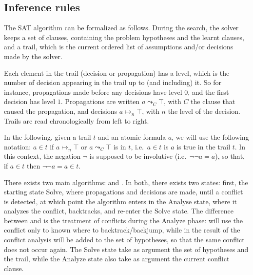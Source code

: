\documentclass{article}
\begin{document}
\subsection{Inference rules}\label{sec:trail}

The SAT algorithm can be formalized as follows. During the search, the solver keeps
a set of clauses, containing the problem hypotheses and the learnt clauses, and
a trail, which is the current ordered list of assumptions and/or decisions made by
the solver.

Each element in the trail (decision or propagation) has a level, which is the number of decision
appearing in the trail up to (and including) it. So for instance, propagations made before any
decisions have level $0$, and the first decision has level $1$. Propagations are written
$a \leadsto_C \top$, with $C$ the clause that caused the propagation, and decisions
$a \mapsto_n \top$, with $n$ the level of the decision. Trails are read
chronologically from left to right.

In the following, given a trail $t$ and an atomic formula $a$, we will use the following notation:
$a \in t$ if $a \mapsto_n \top$ or $a \leadsto_C \top$ is in $t$, i.e.~$a \in t$ is $a$ is true
in the trail $t$. In this context, the negation $\neg$ is supposed to be involutive
(i.e.~$\neg \neg a = a$), so that, if $a \in t$ then $\neg \neg a = a \in t$.

There exists two main \sat{} algorithms: \dpll{} and \cdcl{}. In both, there exists
two states: first, the starting state $\text{Solve}$, where propagations
and decisions are made, until a conflict is detected, at which point the algorithm
enters in the $\text{Analyse}$ state, where it analyzes the conflict, backtracks,
and re-enter the $\text{Solve}$ state. The difference between \dpll{} and \cdcl{}
is the treatment of conflicts during the $\text{Analyze}$ phase: \dpll{} will use
the conflict only to known where to backtrack/backjump, while in \cdcl{} the result
of the conflict analysis will be added to the set of hypotheses, so that the same
conflict does not occur again.
The $\text{Solve}$ state take as argument the set of hypotheses and the trail, while
the $\text{Analyze}$ state also take as argument the current conflict clause.
\end{document}
